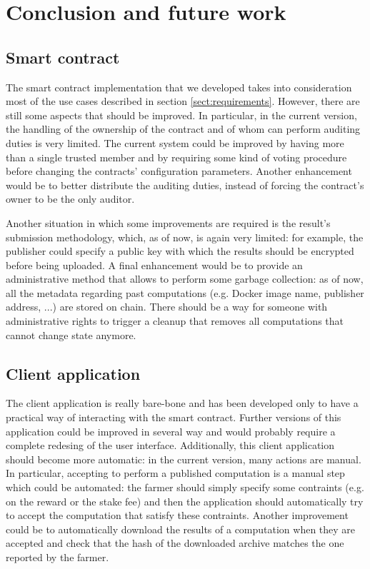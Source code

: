 
\section{Conclusion and future work}
\label{sect:conclusions-and-future-work}

\subsection{Smart contract}
The smart contract implementation that we developed takes into consideration most of the use cases described in section \ref{sect:requirements}. However, there are still some aspects that should be improved.  
In particular, in the current version, the handling of the ownership of the contract and of whom can perform auditing duties is very limited. The current system could be improved by having more than a single trusted member and by requiring some kind of voting procedure before changing the contracts' configuration parameters. Another enhancement would be to better distribute the auditing duties, instead of forcing the contract's owner to be the only auditor.  

Another situation in which some improvements are required is the result's submission methodology, which, as of now, is again very limited: for example, the publisher could specify a public key with which the results should be encrypted before being uploaded.
A final enhancement would be to provide an administrative method that allows to perform some garbage collection: as of now, all the metadata regarding past computations (e.g. Docker image name, publisher address, ...) are stored on chain. There should be a way for someone with administrative rights to trigger a cleanup that removes all computations that cannot change state anymore.

\subsection{Client application}
The client application is really bare-bone and has been developed only to have a practical way of interacting with the smart contract.  Further versions of this application could be improved in several way and would probably require a complete redesing of the user interface.
Additionally, this client application should become more automatic: in the current version, many actions are manual. In particular, accepting to perform a published computation is a manual step which could be automated: the farmer should simply specify some contraints (e.g. on the reward or the stake fee) and then the application should automatically try to accept the computation that satisfy these contraints. Another improvement could be to automatically download the results of a computation when they are accepted and check that the hash of the downloaded archive matches the one reported by the farmer.

